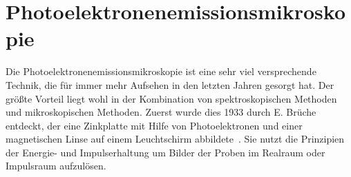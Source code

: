     \section{Photoelektronenemissionsmikroskopie} \label{sec:PEEM}
        Die Photoelektronenemissionsmikroskopie ist eine sehr viel versprechende Technik, die für immer mehr Aufsehen in den letzten Jahren gesorgt hat.
        Der größte Vorteil liegt wohl in der Kombination von spektroskopischen Methoden und mikroskopischen Methoden.
        Zuerst wurde dies 1933 durch E. Brüche entdeckt, der eine Zinkplatte mit Hilfe von Photoelektronen und einer magnetischen Linse auf einem Leuchtschirm abbildete~\cite{bruche_elektronenmikroskopische_1933}.
        Sie nutzt die Prinzipien der Energie- und Impulserhaltung um Bilder der Proben im Realraum oder Impulsraum aufzulösen.

